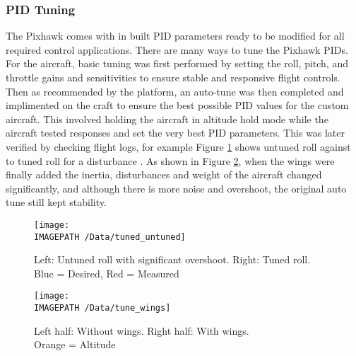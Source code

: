 \subsubsection*{PID Tuning}
The Pixhawk comes with in built PID parameters ready to be modified for all required control applications.  There are many ways to tune the Pixhawk PIDs. For the aircraft, basic tuning was first performed by setting the roll, pitch, and throttle gains and sensitivities to ensure stable and responsive flight controls. Then as recommended by the platform, an auto-tune was then completed and implimented on the craft to ensure the best possible PID values for the custom aircraft. This involved holding the aircraft in altitude hold mode while the aircraft tested responses and set the very best PID parameters. This was later verified by checking flight logs, for example Figure \ref{fig:tune1} shows untuned roll against to tuned roll for a disturbance . As shown in Figure \ref{fig:tune2}, when the wings were finally added the inertia, disturbances and weight of the aircraft changed significantly, and although there is more noise and overshoot, the original auto tune still kept stability. 

\begin{figure}[!ht]
	\centering
	\texttt{[image: \\IMAGEPATH /Data/tuned\_untuned]}
	\caption{Left: Untuned roll with significant overshoot. Right: Tuned roll.\\Blue = Desired, Red = Measured}
	\label{fig:tune1}
\end{figure}

\begin{figure}[!ht]
	\centering
	\texttt{[image: \\IMAGEPATH /Data/tune\_wings]}
	\caption{Left half: Without wings. Right half: With wings.\\ Orange = Altitude}
	\label{fig:tune2}
\end{figure}


